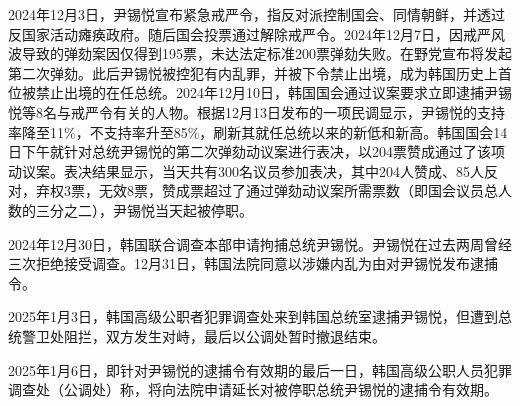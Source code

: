 2024年12月3日，尹锡悦宣布紧急戒严令，指反对派控制国会、同情朝鲜，并透过反国家活动瘫痪政府。随后国会投票通过解除戒严令。2024年12月7日，因戒严风波导致的弹劾案因仅得到195票，未达法定标准200票弹劾失败。在野党宣布将发起第二次弹劾。此后尹锡悦被控犯有内乱罪，并被下令禁止出境，成为韩国历史上首位被禁止出境的在任总统。2024年12月10日，韩国国会通过议案要求立即逮捕尹锡悦等8名与戒严令有关的人物。根据12月13日发布的一项民调显示，尹锡悦的支持率降至11\%，不支持率升至85\%，刷新其就任总统以来的新低和新高。韩国国会14日下午就针对总统尹锡悦的第二次弹劾动议案进行表决，以204票赞成通过了该项动议案。表决结果显示，当天共有300名议员参加表决，其中204人赞成、85人反对，弃权3票，无效8票，赞成票超过了通过弹劾动议案所需票数（即国会议员总人数的三分之二），尹锡悦当天起被停职。

2024年12月30日，韩国联合调查本部申请拘捕总统尹锡悦。尹锡悦在过去两周曾经三次拒绝接受调查。12月31日，韩国法院同意以涉嫌内乱为由对尹锡悦发布逮捕令。

2025年1月3日，韩国高级公职者犯罪调查处来到韩国总统室逮捕尹锡悦，但遭到总统警卫处阻拦，双方发生对峙，最后以公调处暂时撤退结束。

2025年1月6日，即针对尹锡悦的逮捕令有效期的最后一日，韩国高级公职人员犯罪调查处（公调处）称，将向法院申请延长对被停职总统尹锡悦的逮捕令有效期。